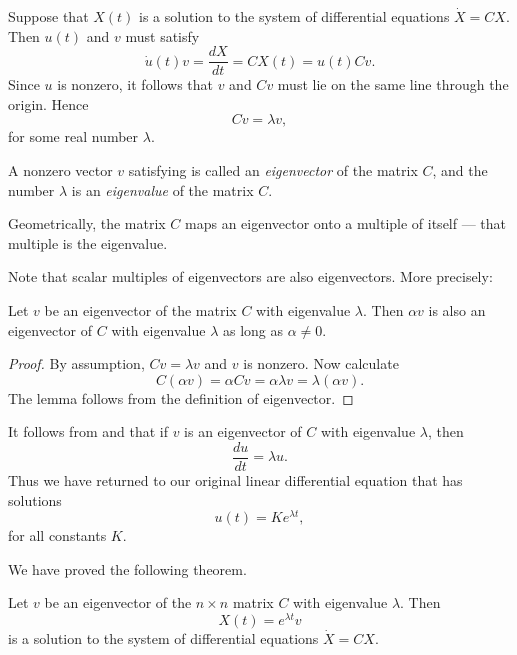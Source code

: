\documentclass{ximera}
\begin{document}
Suppose that $X(t)$ is a solution to the system of differential
equations $\dot{X}=CX$.  Then $u(t)$ and $v$ must satisfy
\begin{equation}  \label{E:diffdir}
\dot{u}(t)v = \frac{dX}{dt} = CX(t) = u(t) Cv.
\end{equation}
Since $u$ is nonzero, it follows that $v$ and $Cv$ must lie on the
same line through the origin.  Hence
\begin{equation}  \label{e:eigendef}
Cv = \lambda v,
\end{equation}
for some real number $\lambda$.

\begin{Def}  \label{D:eigenvalue1}
A nonzero vector $v$ satisfying  is called an
{\em eigenvector\/}  of the matrix $C$, and
the number $\lambda$ is an {\em eigenvalue\/} 
of the matrix $C$.
\end{Def}
Geometrically, the matrix $C$ maps an eigenvector onto a multiple
of itself --- that multiple is the eigenvalue.

Note that scalar multiples of eigenvectors are also eigenvectors.  More 
precisely:
\begin{lemma}  \label{L:e'vector}
Let $v$ be an eigenvector of the matrix $C$ with eigenvalue $\lambda$.   
Then $\alpha v$ is also an eigenvector of $C$ with eigenvalue $\lambda$ 
as long as $\alpha\neq 0$.
\end{lemma}

\begin{proof} By assumption, $Cv=\lambda v$ and $v$ is nonzero. Now calculate
\[
C(\alpha v) = \alpha Cv = \alpha\lambda v = \lambda(\alpha v).
\]
The lemma follows from the definition of eigenvector.  \end{proof}

It follows from  and  that if $v$ is
an eigenvector of $C$ with eigenvalue $\lambda$, then
\[
\frac{du}{dt} = \lambda u.
\]
Thus we have returned to our original linear differential
equation that has solutions
\[
u(t) = Ke^{\lambda t},
\]
for all constants $K$.

We have proved the following theorem.
\begin{thm}  \label{T:eigensoln}
Let $v$ be an eigenvector of the $n\times n$ matrix $C$ with
eigenvalue $\lambda$.  Then
\[
X(t) = e^{\lambda t}v
\]
is a solution to the system of differential equations $\dot{X}=CX$.
\end{thm}
\end{document}
